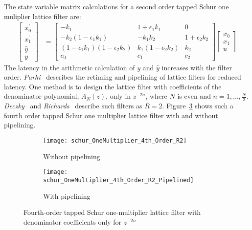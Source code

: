 \documentclass[a4paper,twoside,10pt,english]{article}
\newcommand{\DesignOfSchurLatticeFiltersIncludeScale}{0.85}
\begin{document}
The state variable matrix calculations for a second order tapped Schur one
muliplier lattice filter are:
\begin{align*}
  \left[\begin{array}{c}
    x_{0}^{\prime} \\
    x_{1}^{\prime} \\
    \hat{y} \\
    y\end{array}\right] &= 
  \left[\begin{array}{ccc}- k_{1} & 1+\epsilon_{1} k_{1} & 0\\
-k_{2}\left(1-\epsilon_{1}k_{1}\right) & -k_{1}k_{2}& 1+\epsilon_{2}k_{2} \\
 \left(1-\epsilon_{1}k_{1}\right)\left(1-\epsilon_{2}k_{2}\right) &
   k_{1}\left(1-\epsilon_{2}k_{2}\right) & k_{2} \\
 c_{0} & c_{1} & c_{2} \end{array}\right] \left[\begin{array}{c}
    x_{0} \\
    x_{1} \\
    u \end{array} \right]
\end{align*}
The latency in the arithmetic calculation of $y$ and $\hat{y}$
increases with the filter order. \emph{Parhi}~\cite[Chapter 4 and Section 12.8]
{Parhi_VLSIDigitalSignalProcessingSystems} describes the retiming and pipelining
of lattice filters for reduced latency. One method is to design the lattice
filter with coefficients of the denominator polynomial, $A_{N}\left(z\right)$,
only in $z^{-2n}$, where $N$ is even and $n=1,\hdots,\frac{N}{2}$.
\emph{Deczky}~\cite{Deczky_MinPSynthesisIIRDigitalFilters} and
\emph{Richards}~\cite{Richards_DeczkyRecursiveDecimator} describe such filters
as $R=2$.
Figure~\ref{fig:Fourth-order-tapped-Schur-one-multiplier-lattice-filter-R2}
shows such a fourth order tapped Schur one multiplier lattice filter with and
without pipelining.

\begin{figure}
\begin{subfigure}[b]{\textwidth}
\centering
\texttt{[image: schur\_OneMultiplier\_4th\_Order\_R2]}
\caption{Without pipelining}
\label{subfig:Fourth-order-tapped-Schur-one-multiplier-lattice-R2-without}
\end{subfigure}
\begin{subfigure}[b]{\textwidth}
\centering
\texttt{[image: schur\_OneMultiplier\_4th\_Order\_R2\_Pipelined]}
\caption{With pipelining}
\label{subfig:Fourth-order-tapped-Schur-one-multiplier-lattice-R2-with}
\end{subfigure}
\caption{Fourth-order tapped Schur one-multiplier lattice filter with denominator
  coefficients only for $z^{-2n}$}
\label{fig:Fourth-order-tapped-Schur-one-multiplier-lattice-filter-R2}
\end{figure}
\end{document}
